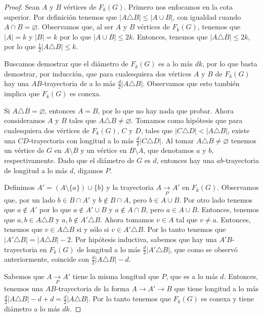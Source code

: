 \begin{proof}
Sean $A$ y $B$ v\'ertices de $F_{k}(G)$. Primero nos enfocamos en la cota
superior. Por definici\'on tenemos que $|A \triangle B| \leq |A \cup B|$, con
igualdad cuando $A \cap B = \varnothing$. Observamos que, al ser $A$ y $B$
v\'ertices de $F_{k}(G)$, tenemos que $|A|=k$ y $|B|=k$ por lo que $|A \cup B|
\le 2k$. Entonces, tenemos que $|A \triangle B| \leq 2k$, por lo que
$\frac{1}{2} |A \triangle B| \leq k$.

Buscamos demostrar que el di\'ametro de $F_{k}(G)$ es a lo m\'as $d k$, por
lo que basta demostrar, por inducci\'on, que para cualesquiera dos v\'ertices
$A$ y $B$ de $F_{k}(G)$ hay una $AB$-trayectoria de a lo m\'as
$\frac{d}{2}|A\triangle B|$. Observamos que esto tambi\'en implica que
$F_{k}(G)$ es conexa.

Si $A\triangle B=\varnothing$, entonces $A=B$, por lo que no hay nada que probar.
Ahora consideramos $A$ y $B$ tales que $A\triangle B \neq \varnothing$. Tomamos
como hip\'otesis que para cualesquiera dos v\'ertices de $F_{k}(G)$, $C$ y $D$,
tales que $|C\triangle D|<|A \triangle B|$, existe una $CD$-trayectoria con
longitud a lo m\'as $\frac{d}{2}|C\triangle D|$. Al tomar $A\triangle B
\neq \varnothing$ tenemos un v\'ertice de $G$ en $A\setminus B$ y un v\'ertice
en $B\setminus A$, que denotamos $a$ y $b$, respectivamente. Dado que el
di\'ametro de $G$ es $d$, entonces hay una $ab$-trayectoria de longitud a
lo m\'as $d$, digamos $P$.

Definimos $A'=(A\setminus \{a\})\cup \{b\}$ y la trayectoria $A\xrightarrow[P]{}
A'$ en $F_{k}(G)$. Observamos que, por un lado $b\in B\cap A'$ y $b\notin B\cap
A$, pero $b\in A\cup B$. Por otro lado tenemos que $a\notin A'$ por lo que
$a\notin A'\cup B$ y $a\notin A\cap B$, pero $a\in A\cup B$. Entonces, tenemos
que $a,b \in A\triangle B$ y $a,b \notin A'\triangle B$. Ahora tomamos $v\in A$
tal que $v \neq a$. Entonces, tenemos que $v \in A\triangle B$ si y s\'olo si
$v\in A'\triangle B$. Por lo tanto tenemos que $|A'\triangle B|=|A \triangle B|-
2$. Por hip\'otesis inductiva, sabemos que hay una $A'B$-trayectoria en
$F_{k}(G)$ de longitud a lo m\'as $\frac{d}{2}|A'\triangle B|$, que como se
observ\'o anteriormente, coincide con $\frac{d}{2}|A\triangle B| - d$.

Sabemos que $A\xrightarrow[P]{} A'$ tiene la misma longitud que $P$, que es a lo
m\'as $d$. Entonces, tenemos una $AB$-trayectoria de la forma $A\rightarrow
A'\rightarrow B$ que tiene longitud a lo m\'as $\frac{d}{2}|A\triangle
B|-d +d =\frac{d}{2}|A\triangle B|$. Por lo tanto tenemos que
$F_{k}(G)$ es conexa y tiene di\'ametro a lo m\'as $d k$.


\end{proof}
